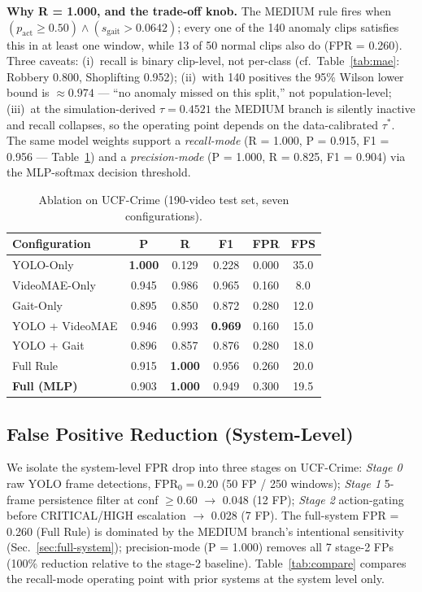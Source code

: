 \documentclass[runningheads]{llncs}
\begin{document}
\textbf{Why R = 1.000, and the trade-off knob.} The MEDIUM rule fires when $(p_\text{act} \geq 0.50) \wedge (s_\text{gait} > 0.0642)$; every one of the 140 anomaly clips satisfies this in at least one window, while 13 of 50 normal clips also do (FPR = 0.260). Three caveats: (i)~recall is binary clip-level, not per-class (cf.\ Table~\ref{tab:mae}: Robbery 0.800, Shoplifting 0.952); (ii)~with 140 positives the 95\% Wilson lower bound is $\approx 0.974$ --- ``no anomaly missed on this split,'' not population-level; (iii)~at the simulation-derived $\tau=0.4521$ the MEDIUM branch is silently inactive and recall collapses, so the operating point depends on the data-calibrated $\tau^*$. The same model weights support a \emph{recall-mode} (R = 1.000, P = 0.915, F1 = 0.956 --- Table~\ref{tab:ablation}) and a \emph{precision-mode} (P = 1.000, R = 0.825, F1 = 0.904) via the MLP-softmax decision threshold.

\begin{table}[!htbp]
\caption{Ablation on UCF-Crime (190-video test set, seven configurations).}
\label{tab:ablation}
\centering
\small
\setlength{\tabcolsep}{3.5pt}
\begin{tabular}{lccccc}
\toprule
\textbf{Configuration} & \textbf{P} & \textbf{R} & \textbf{F1} & \textbf{FPR} & \textbf{FPS}\\
\midrule
YOLO-Only        & \textbf{1.000} & 0.129 & 0.228 & 0.000 & 35.0\\
VideoMAE-Only    & 0.945 & 0.986 & 0.965 & 0.160 &  8.0\\
Gait-Only        & 0.895 & 0.850 & 0.872 & 0.280 & 12.0\\
YOLO + VideoMAE  & 0.946 & 0.993 & \textbf{0.969} & 0.160 & 15.0\\
YOLO + Gait      & 0.896 & 0.857 & 0.876 & 0.280 & 18.0\\
Full Rule        & 0.915 & \textbf{1.000} & 0.956 & 0.260 & 20.0\\
\textbf{Full (MLP)} & 0.903 & \textbf{1.000} & 0.949 & 0.300 & 19.5\\
\bottomrule
\end{tabular}
\end{table}

\subsection{False Positive Reduction (System-Level)}\label{sec:fp}

We isolate the system-level FPR drop into three stages on UCF-Crime: \emph{Stage 0} raw YOLO frame detections, $\text{FPR}_0 = 0.20$ (50 FP / 250 windows); \emph{Stage 1} 5-frame persistence filter at conf $\geq 0.60$ $\to$ 0.048 (12 FP); \emph{Stage 2} action-gating before CRITICAL/HIGH escalation $\to$ 0.028 (7 FP). The full-system FPR = 0.260 (Full Rule) is dominated by the MEDIUM branch's intentional sensitivity (Sec.~\ref{sec:full-system}); precision-mode (P = 1.000) removes all 7 stage-2 FPs (100\% reduction relative to the stage-2 baseline). Table~\ref{tab:compare} compares the recall-mode operating point with prior systems at the system level only.
\end{document}
